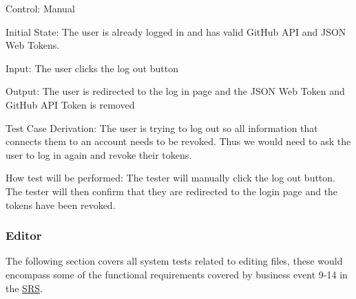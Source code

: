 \documentclass[12pt, titlepage]{article}
\begin{document}
\begin{enumerate}
		Control: Manual
		
		Initial State: The user is already logged in and has valid GitHub API and JSON Web Tokens.
		
		Input: The user clicks the log out button
		
		Output: The user is redirected to the log in page and the JSON Web Token and GitHub API Token is removed
		
		Test Case Derivation: The user is trying to log out so all information that connects them to an account needs to be revoked. Thus we would need to ask the user to log in again and revoke their tokens.
		
		How test will be performed: The tester will manually click the log out button. The tester will then confirm that they are redirected to the login page and the tokens have been revoked.
		
	\end{enumerate}
	
	\subsubsection{Editor}
	
	The following section covers all system tests related to editing files, these would encompass some of the functional requirements covered by business event 9-14 in the \href{https://github.com/RutheniumVI/UnderTree/blob/main/docs/SRS/SRS.pdf}{SRS}.
	
\end{document}
